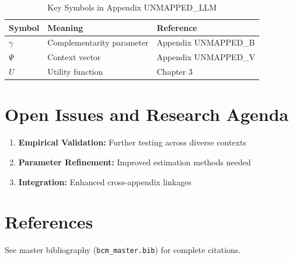\begin{table}[htbp]
\centering
\caption{Key Symbols in Appendix UNMAPPED_LLM}
\begin{tabular}{lll}
\toprule
\textbf{Symbol} & \textbf{Meaning} & \textbf{Reference} \\
\midrule
$\gamma$ & Complementarity parameter & Appendix UNMAPPED_B \\
$\Psi$ & Context vector & Appendix UNMAPPED_V \\
$U$ & Utility function & Chapter 3 \\
\bottomrule
\end{tabular}
\end{table}



\section{Open Issues and Research Agenda}
\label{sec:llm-open}

\begin{enumerate}
    \item \textbf{Empirical Validation:} Further testing across diverse contexts
    \item \textbf{Parameter Refinement:} Improved estimation methods needed
    \item \textbf{Integration:} Enhanced cross-appendix linkages
\end{enumerate}

\section{References}
\label{sec:llm-references}

See master bibliography (\texttt{bcm\_master.bib}) for complete citations.

\nocite{bcm_master}

